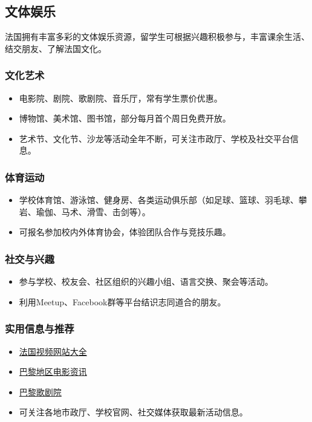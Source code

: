 \subsection{文体娱乐}
法国拥有丰富多彩的文体娱乐资源，留学生可根据兴趣积极参与，丰富课余生活、结交朋友、了解法国文化。

\subsubsection{文化艺术}
\begin{itemize}
    \item 电影院、剧院、歌剧院、音乐厅，常有学生票价优惠。
    \item 博物馆、美术馆、图书馆，部分每月首个周日免费开放。
    \item 艺术节、文化节、沙龙等活动全年不断，可关注市政厅、学校及社交平台信息。
\end{itemize}

\subsubsection{体育运动}
\begin{itemize}
    \item 学校体育馆、游泳馆、健身房、各类运动俱乐部（如足球、篮球、羽毛球、攀岩、瑜伽、马术、滑雪、击剑等）。
    \item 可报名参加校内外体育协会，体验团队合作与竞技乐趣。
\end{itemize}

\subsubsection{社交与兴趣}
\begin{itemize}
    \item 参与学校、校友会、社区组织的兴趣小组、语言交换、聚会等活动。
    \item 利用Meetup、Facebook群等平台结识志同道合的朋友。
\end{itemize}

\subsubsection{实用信息与推荐}
\begin{itemize}
    \item \href{https://www.ecentime.com/article/streaming-website}{法国视频网站大全}
    \item \href{https://paris-cine.info/}{巴黎地区电影资讯}
    \item \href{https://www.operadeparis.fr/en}{巴黎歌剧院}
    \item 可关注各地市政厅、学校官网、社交媒体获取最新活动信息。
\end{itemize}
